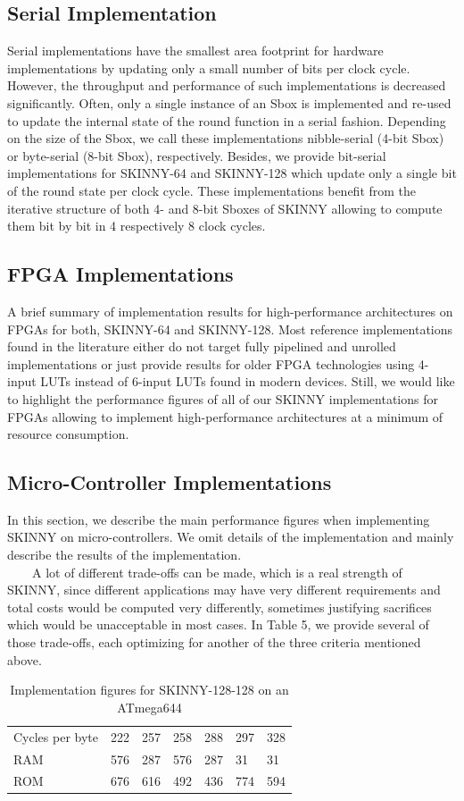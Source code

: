 \documentclass[preprint]{transcrypto}
\begin{document}
{\subsection{Serial Implementation}
\tab Serial implementations have the smallest area footprint for hardware implementations
by updating only a small number of bits per clock cycle. However, the throughput and
performance of such implementations is decreased significantly. Often, only a single instance
of an Sbox is implemented and re-used to update the internal state of the round function
in a serial fashion. Depending on the size of the Sbox, we call these implementations
nibble-serial (4-bit Sbox) or byte-serial (8-bit Sbox), respectively. Besides, we provide bit-serial implementations for SKINNY-64 and SKINNY-128
which update only a single bit of the round state per clock cycle. These implementations
benefit from the iterative structure of both 4- and 8-bit Sboxes of SKINNY allowing to
compute them bit by bit in 4 respectively 8 clock cycles.
\subsection{FPGA Implementations}
\tab A brief summary of implementation results for high-performance architectures on
FPGAs for both, SKINNY-64 and SKINNY-128.
Most reference implementations found in the
literature either do not target fully pipelined and unrolled implementations or just provide
results for older FPGA technologies using 4-input LUTs instead of 6-input LUTs found
in modern devices. Still, we would like to highlight the performance figures of all of our
SKINNY implementations for FPGAs allowing to implement high-performance architectures
at a minimum of resource consumption.
\subsection{Micro-Controller Implementations}
\tab In this section, we describe the main performance figures when implementing SKINNY on
micro-controllers. We omit details of the implementation and mainly describe the results
of the implementation.\\
\tab$\quad\quad$A lot of different trade-offs can be made, which is a real strength of SKINNY, since
different applications may have very different requirements and total costs would be
computed very differently, sometimes justifying sacrifices which would be unacceptable in
most cases. In Table 5, we provide several of those trade-offs, each optimizing for another
of the three criteria mentioned above.\\
\begin{table}[hbt]
	\centering
	\begin{tabular}{lllllll}
		\hline
		Cycles per byte & 222 & 257 & 258 & 288 & 297 & 328 \\
		RAM             & 576 & 287 & 576 & 287 & 31  & 31  \\
		ROM             & 676 & 616 & 492 & 436 & 774 & 594 \\ \hline
	\end{tabular}
\caption{Implementation figures for SKINNY-128-128 on an ATmega644}
\end{table}

}
\end{document}
